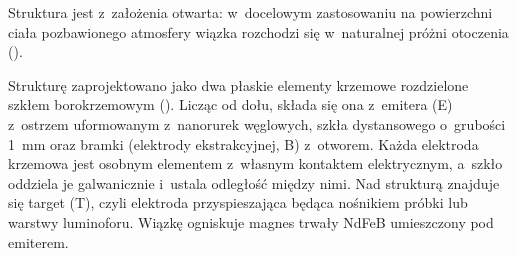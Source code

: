 \begin{zmiana}
Struktura jest z~założenia otwarta: w~docelowym zastosowaniu na
powierzchni ciała pozbawionego atmosfery wiązka rozchodzi się
w~naturalnej próżni otoczenia ().
\end{zmiana}

Strukturę zaprojektowano jako dwa płaskie elementy krzemowe
rozdzielone szkłem borokrzemowym ().
Licząc od dołu, składa się ona z~emitera (E) z~ostrzem uformowanym
z~nanorurek węglowych, szkła dystansowego o~grubości \SI{1}{\milli\metre}
oraz bramki (elektrody ekstrakcyjnej, B) z~otworem. Każda elektroda
krzemowa jest osobnym elementem z~własnym kontaktem elektrycznym,
a~szkło oddziela je galwanicznie i~ustala odległość między nimi.
Nad strukturą znajduje się target (T), czyli elektroda przyspieszająca
będąca nośnikiem próbki lub warstwy luminoforu. Wiązkę ogniskuje magnes
trwały NdFeB umieszczony pod emiterem.

